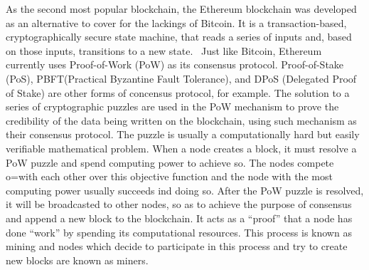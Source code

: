     As the second most popular blockchain, the Ethereum blockchain was developed as an alternative to cover for the lackings of Bitcoin.
    It is a transaction-based, cryptographically secure state machine, that reads a series of inputs and, based on those inputs, transitions to a new state.~\cite{ferreira2022smart}
    Just like Bitcoin, Ethereum currently uses Proof-of-Work (PoW) as its consensus protocol.
    Proof-of-Stake (PoS), PBFT(Practical Byzantine Fault Tolerance), and DPoS (Delegated Proof of Stake) are other forms of concensus protocol, for example.
    The solution to a series of cryptographic puzzles are used in the PoW mechanism to prove the credibility of the data being written on the blockchain, using such mechanism as their consensus protocol.
    The puzzle is usually a computationally hard but easily verifiable mathematical problem.
    When a node creates a block, it must resolve a PoW puzzle and spend computing power to achieve so. The nodes compete o=with each other over this objective function and the node with the most computing power usually succeeds ind doing so.
    After the PoW puzzle is resolved, it will be broadcasted to other nodes, so as to achieve the purpose of consensus and append a new block to the blockchain.
    It acts as a “proof” that a node has done “work” by spending its computational resources.
    This process is known as mining and nodes which decide to participate in this process and try to create new blocks are known as miners.

